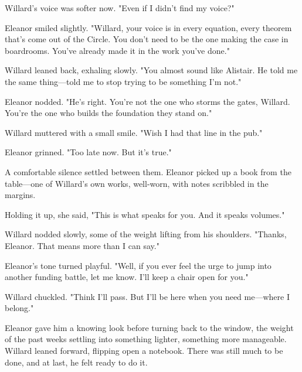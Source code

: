 Willard’s voice was softer now.  
"Even if I didn’t find my voice?"
\smallskip

Eleanor smiled slightly.  
"Willard, your voice is in every equation, every theorem that’s come out of the Circle. You don’t need to be the one making the case in boardrooms. You’ve already made it in the work you’ve done."
\smallskip

Willard leaned back, exhaling slowly.  
"You almost sound like Alistair. He told me the same thing—told me to stop trying to be something I’m not."
\smallskip

Eleanor nodded.  
"He’s right. You’re not the one who storms the gates, Willard. You’re the one who builds the foundation they stand on."
\smallskip

Willard muttered with a small smile.  
"Wish I had that line in the pub."
\smallskip

Eleanor grinned.  
"Too late now. But it’s true."
\smallskip

A comfortable silence settled between them. Eleanor picked up a book from the table—one of Willard’s own works, well-worn, with notes scribbled in the margins.

Holding it up, she said,  
"This is what speaks for you. And it speaks volumes."

Willard nodded slowly, some of the weight lifting from his shoulders.  
"Thanks, Eleanor. That means more than I can say."

Eleanor’s tone turned playful.  
"Well, if you ever feel the urge to jump into another funding battle, let me know. I’ll keep a chair open for you."

Willard chuckled.  
"Think I’ll pass. But I’ll be here when you need me—where I belong."
\smallskip

Eleanor gave him a knowing look before turning back to the window, the weight of the past weeks settling into something lighter, something more manageable. Willard leaned forward, flipping open a notebook. There was still much to be done, and at last, he felt ready to do it.
